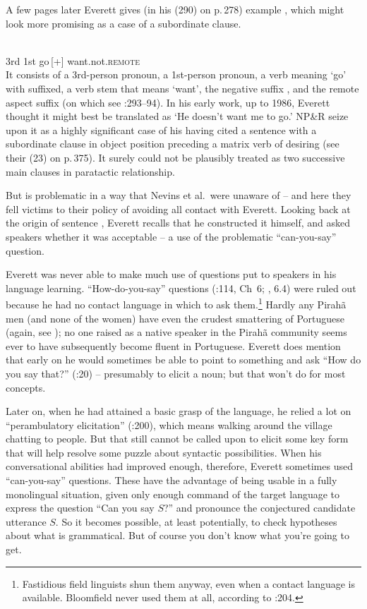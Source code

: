 \documentclass[output=paper,colorlinks,citecolor=brown
]{langscibook}
\begin{document}
A few pages later Everett gives (in his (290) on p.\,278) example ,
which might look more promising as a case of a subordinate clause.

\ea\label{ex:pullum:3}
\gll {}    
            \\
         3rd 1st go\,[+] want.not.\textsc{remote}\\
\z
\noindent
It consists of a 3rd-person pronoun, a 1st-person pronoun, a
verb meaning `go' with \mbox{} suffixed, a verb stem that
means `want', the negative suffix , and the remote aspect
suffix  (on which see \citealt{Everett86HAL}:293--94). In
his early work, up to 1986, Everett thought it might best be translated
as `He doesn't want me to go.' NP\&R seize upon it as a highly significant
case of his having cited a sentence with a subordinate clause in
object position preceding a matrix verb of desiring (see their (23)
on p.\,375). It surely could not be plausibly treated as two successive
main clauses in paratactic relationship.

But  is problematic in a way that Nevins et al.\ were unaware
of -- and here they fell victims to their policy of avoiding all contact
with Everett. Looking back at the origin of sentence , Everett recalls
that he constructed it himself, and asked speakers whether it was
acceptable -- a use of the problematic ``can-you-say'' question.

Everett was never able to make much use of questions put to speakers
in his language learning.  ``How-do-you-say'' questions
(\citealt{Samarin67}:114, Ch~6; \citealt{SakeEver12},
{\textsection}6.4) were ruled out because he had no contact language in
which to ask them.\footnote{%
   Fastidious field linguists shun them anyway, even when a contact language
   is available. Bloomfield never used them at all, according to
   \citealt{Voegelin60}:204.}
Hardly any Pirah{\~a} men (and none of the women) have even the crudest
smattering of Portuguese (again, see \citealt{Sakel12}); no one raised
as a native speaker in the Pirah{\~a} community seems ever to have
subsequently become fluent in Portuguese. Everett does mention that
early on he would sometimes be able to point to something and ask
``How do you say that?'' (\citealt{Everett08}:20) -- presumably
to elicit a noun; but that won't do for most concepts.

Later on, when he had attained a basic grasp of the language, he relied
a lot on ``perambulatory elicitation'' (\citealt{Everett86HAL}:200), which
means walking around the village chatting to people. But that still
cannot be called upon to elicit some key form that will help resolve
some puzzle about syntactic possibilities. When his conversational
abilities had improved enough, therefore, Everett sometimes used
``can-you-say'' questions. These have the advantage of being usable in
a fully monolingual situation, given only enough command of the target
language to express the question ``Can you say $S$?'' and pronounce the
conjectured candidate utterance $S$. So it becomes possible, at least
potentially, to check hypotheses about what is grammatical. But of
course you don't know what you're going to get.
\end{document}
